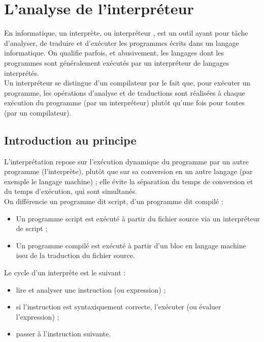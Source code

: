 \chapter{L'analyse de l'interpréteur}



En informatique, un interprète, ou interpréteur , est un outil ayant pour tâche d'analyser, de traduire et d'exécuter les programmes écrits dans un langage informatique. On qualifie parfois, et abusivement, les langages dont les programmes sont généralement exécutés par un interpréteur de langages interprétés.
\\[0.5cm]
Un interpréteur se distingue d’un compilateur par le fait que, pour exécuter un programme, les opérations d’analyse et de traductions sont réalisées à chaque exécution du programme (par un interpréteur) plutôt qu’une fois pour toutes (par un compilateur).


\section{Introduction au principe}

L'interprétation repose sur l'exécution dynamique du programme par un autre programme (l'interprète), plutôt que sur sa conversion en un autre langage (par exemple le langage machine) ; elle évite la séparation du temps de conversion et du temps d'exécution, qui sont simultanés.
\\[0.5cm]

On différencie un programme dit script, d'un programme dit compilé :

\begin{itemize}
\item Un programme script est exécuté à partir du fichier source via un interpréteur de script ;
\item Un programme compilé est exécuté à partir d'un bloc en langage machine issu de la traduction du fichier source.
\end{itemize}

Le cycle d'un interprète est le suivant :
\begin{itemize}
\item lire et analyser une instruction (ou expression) ;
\item si l'instruction est syntaxiquement correcte, l'exécuter (ou évaluer l'expression) ;
\item passer à l'instruction suivante.
\end{itemize}

